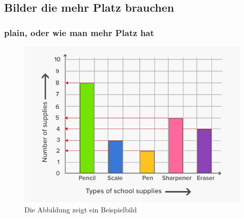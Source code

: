 \documentclass[handout]{beamer} %
\begin{document}
	\subsection{Bilder die mehr Platz brauchen} 
	\begin{frame}[plain]
		\frametitle{plain, oder wie man mehr Platz hat}
		\begin{figure}
			\includegraphics[scale=0.3]{PIC1} 
			\caption{Die Abbildung zeigt ein Beispielbild}
		\end{figure}
	\end{frame}
	
	
\end{document}
